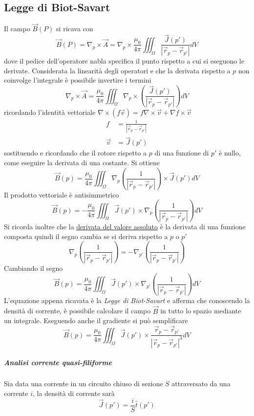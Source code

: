 \subsection{Legge di Biot-Savart}
Il campo $\vec{B}(P)$ si ricava con
$$
\vec{B}(P) = \nabla_p\times\vec{A} = \nabla_p \times \frac{\mu_0}{4\pi}\iiint_\Omega\frac{\vec{J}(p')}{|\vec{r}_p-\vec{r}_{p'}|}dV
$$
dove il pedice dell'operatore nabla specifica il punto rispetto a cui si eseguono le 
derivate.
Considerata la linearità degli operatori e che la derivata rispetto a $p$ non coinvolge
l'integrale è possibile invertire i termini
$$
\nabla_p\times\vec{A} = \frac{\mu_0}{4\pi}\iiint_\Omega \nabla_p\times\left(\frac{\vec{J}(p')}{|\vec{r}_p-\vec{r}_{p'}|}\right)dV
$$
ricordando l'identità vettoriale $\nabla\times(f\vec{v}) = f\nabla\times\vec{v} + \nabla f\times\vec{v}$  
\begin{align*}
f &= \frac{1}{|\vec{r}_p-\vec{r}_{p'}|} \\
\vec{v} &= \vec{J}(p')
\end{align*}
sostituendo e ricordando che il rotore rispetto a $p$ di una funzione
di $p'$ è nullo, come eseguire la derivata di una costante. Si ottiene
$$
\vec{B}(p) = \frac{\mu_0}{4\pi}\iiint_\Omega \nabla_p \left(\frac{1}{|\vec{r}_p-\vec{r}_{p'}|}\right) \times \vec{J}(p') dV
$$
Il prodotto vettoriale è antisimmetrico
$$
\vec{B}(p) = -\frac{\mu_0}{4\pi}\iiint_\Omega \vec{J}(p') \times\nabla_p\left(\frac{1}{|\vec{r}_p - \vec{r}_{p'}|}\right)dV
$$
Si ricorda inoltre che la \href{https://www.youmath.it/domande-a-risposte/view/5914-derivata-del-modulo.html}{derivata del valore assoluto} è la derivata di una funzione 
composta quindi il segno cambia se si deriva rispetto a $p$ o $p'$
$$
\nabla_p \left(\frac{1}{|\vec{r}_p - \vec{r}_{p'}|}\right) = -\nabla_{p'} \left(\frac{1}{|\vec{r}_p - \vec{r}_{p'}|}\right)
$$
Cambiando il segno
$$
\vec{B}(p) = \frac{\mu_0}{4\pi}\iiint_\Omega \vec{J}(p') \times\nabla_{p'}\left(\frac{1}{|\vec{r}_p - \vec{r}_{p'}|}\right)dV
$$
L'equazione appena ricavata è la \textit{Legge di Biot-Savart} e afferma che conoscendo
la densità di corrente, è possibile calcolare il campo $\vec{B}$ in tutto lo spazio
mediante un integrale.
Eseguendo anche il gradiente si può semplificare
$$
\vec{B}(p) = \frac{\mu_0}{4\pi}\iiint_\Omega \vec{J}(p') \times \frac{\vec{r}_p-\vec{r}_{p'}}{|\vec{r}_p - \vec{r}_{p'}|^3}dV
$$
\subparagraph{Analisi corrente quasi-filiforme}
Sia data una corrente in un circuito chiuso di sezione $S$ attraversato da una corrente
$i$, la densità di corrente sarà
$$
\vec{J}(p') = \frac{i}{S} \hat{t}(p')
$$
